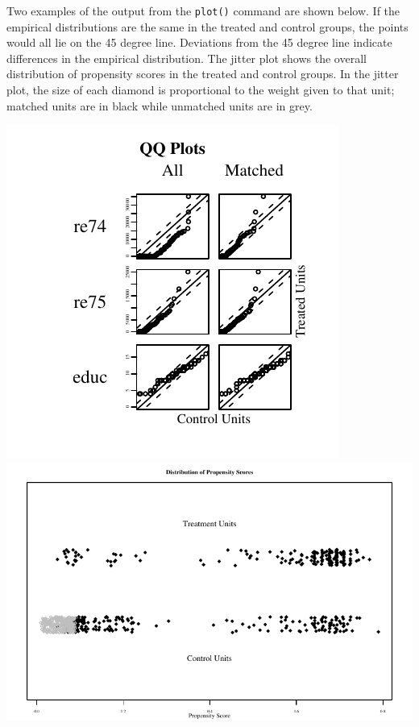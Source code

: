 Two examples of the output from the {\tt plot()} command are shown
below.  If the empirical distributions are the same in the treated and
control groups, the points would all lie on the 45 degree line.
Deviations from the 45 degree line indicate differences in the
empirical distribution.  The jitter plot shows the overall
distribution of propensity scores in the treated and control groups.
In the jitter plot, the size of each diamond is proportional to the
weight given to that unit; matched units are in black while unmatched
units are in grey.

\includegraphics{figs/qqplotnn1}
\includegraphics{figs/jitterplotnn}


